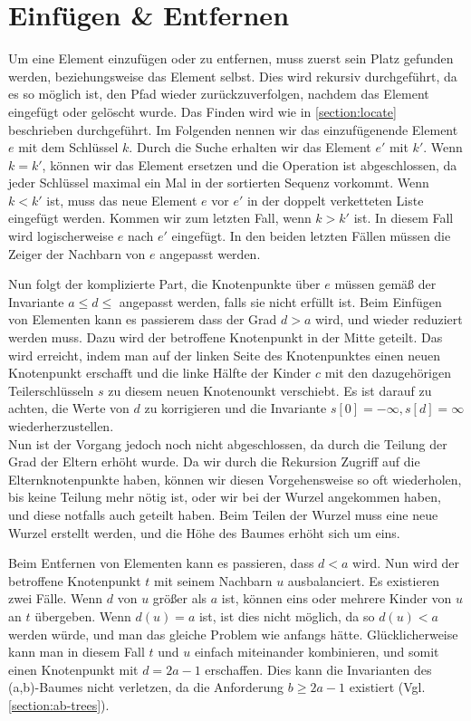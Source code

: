\section{Einfügen \& Entfernen}
\label{section:insert-remove}

Um eine Element einzufügen oder zu entfernen, muss zuerst sein Platz gefunden werden, beziehungsweise das Element selbst. Dies wird rekursiv durchgeführt, da es so möglich ist, den Pfad wieder zurückzuverfolgen, nachdem das Element eingefügt oder gelöscht wurde. Das Finden wird wie in \autoref{section:locate} beschrieben durchgeführt. Im Folgenden nennen wir das einzufügenende Element $e$ mit dem Schlüssel $k$. Durch die Suche erhalten wir das Element $e'$ mit $k'$. Wenn $k = k'$, können wir das Element ersetzen und die Operation ist abgeschlossen, da jeder Schlüssel maximal ein Mal in der sortierten Sequenz vorkommt. Wenn $k < k'$ ist, muss das neue Element $e$ vor $e'$ in der doppelt verketteten Liste eingefügt werden. Kommen wir zum letzten Fall, wenn $k > k'$ ist. In diesem Fall wird logischerweise $e$ nach $e'$ eingefügt. In den beiden letzten Fällen müssen die Zeiger der Nachbarn von $e$ angepasst werden.
\par
Nun folgt der komplizierte Part, die Knotenpunkte über $e$ müssen gemäß der Invariante $a \leq d \leq$ angepasst werden, falls sie nicht erfüllt ist. Beim Einfügen von Elementen kann es passierem dass der Grad $d > a$ wird, und wieder reduziert werden muss. Dazu wird der betroffene Knotenpunkt in der Mitte geteilt. Das wird erreicht, indem man auf der linken Seite des Knotenpunktes einen neuen Knotenpunkt erschafft und die linke Hälfte der Kinder $c$ mit den dazugehörigen Teilerschlüsseln $s$ zu diesem neuen Knotenounkt verschiebt. Es ist darauf zu achten, die Werte von $d$ zu korrigieren und die Invariante $s[0] = - \infty, s[d] = \infty$ wiederherzustellen.
\\
Nun ist der Vorgang jedoch noch nicht abgeschlossen, da durch die Teilung der Grad der Eltern erhöht wurde. Da wir durch die Rekursion Zugriff auf die Elternknotenpunkte haben, können wir diesen Vorgehensweise so oft wiederholen, bis keine Teilung mehr nötig ist, oder wir bei der Wurzel angekommen haben, und diese notfalls auch geteilt haben. Beim Teilen der Wurzel muss eine neue Wurzel erstellt werden, und die Höhe des Baumes erhöht sich um eins.
\par
Beim Entfernen von Elementen kann es passieren, dass $d < a$ wird. Nun wird der betroffene Knotenpunkt $t$ mit seinem Nachbarn $u$ ausbalanciert. Es existieren zwei Fälle. Wenn $d$ von $u$ größer als $a$ ist, können eins oder mehrere Kinder von $u$ an $t$ übergeben. Wenn $d(u) = a$ ist, ist dies nicht möglich, da so $d(u) < a$ werden würde, und man das gleiche Problem wie anfangs hätte. Glücklicherweise kann man in diesem Fall $t$ und $u$ einfach miteinander kombinieren, und somit einen Knotenpunkt mit $d = 2a-1$ erschaffen. Dies kann die Invarianten des (a,b)-Baumes nicht verletzen, da die Anforderung $b \geq 2a-1$ existiert (Vgl. \autoref{section:ab-trees}).

